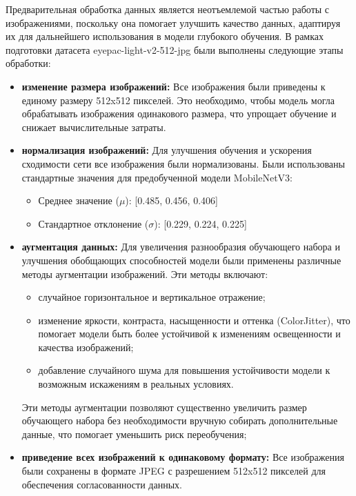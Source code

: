 {    Предварительная обработка данных является неотъемлемой частью работы с изображениями, поскольку она помогает улучшить качество данных, адаптируя их для дальнейшего использования в модели глубокого обучения. В рамках подготовки датасета eyepac-light-v2-512-jpg были выполнены следующие этапы обработки:
    
    \begin{itemize}
        \item \textbf{изменение размера изображений:} Все изображения были приведены к единому размеру 512x512 пикселей. Это необходимо, чтобы модель могла обрабатывать изображения одинакового размера, что упрощает обучение и снижает вычислительные затраты.
        
        \item \textbf{нормализация изображений:} Для улучшения обучения и ускорения сходимости сети все изображения были нормализованы. Были использованы стандартные значения для предобученной модели MobileNetV3: 
        \begin{itemize}
            \item Среднее значение (\(\mu\)): [0.485, 0.456, 0.406]
            \item Стандартное отклонение (\(\sigma\)): [0.229, 0.224, 0.225]
        \end{itemize}
        
        \item \textbf{аугментация данных:} Для увеличения разнообразия обучающего набора и улучшения обобщающих способностей модели были применены различные методы аугментации изображений. Эти методы включают:
        \begin{itemize}
            \item случайное горизонтальное и вертикальное отражение;
            \item изменение яркости, контраста, насыщенности и оттенка (ColorJitter), что помогает модели быть более устойчивой к изменениям освещенности и качества изображений;
            \item добавление случайного шума для повышения устойчивости модели к возможным искажениям в реальных условиях.
        \end{itemize}
        
        Эти методы аугментации позволяют существенно увеличить размер обучающего набора без необходимости вручную собирать дополнительные данные, что помогает уменьшить риск переобучения;
    
        \item \textbf{приведение всех изображений к одинаковому формату:} Все изображения были сохранены в формате JPEG с разрешением 512x512 пикселей для обеспечения согласованности данных.
    \end{itemize}
    
}

